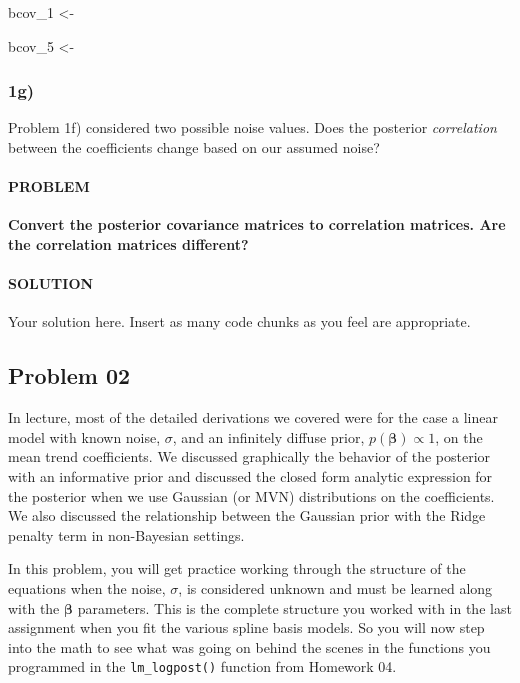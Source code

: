 \documentclass[
]{article}
\newenvironment{Shaded}{\begin{snugshade}}{\end{snugshade}}
\newcommand{\DecValTok}[1]{\textcolor[rgb]{0.00,0.00,0.81}{#1}}
\newcommand{\NormalTok}[1]{#1}
\newcommand{\StringTok}[1]{\textcolor[rgb]{0.31,0.60,0.02}{#1}}
\begin{document}
\begin{Shaded}
\begin{Highlighting}[]
\NormalTok{bcov_}\DecValTok{1}\NormalTok{ <-}\StringTok{ }

\NormalTok{bcov_}\DecValTok{5}\NormalTok{ <-}\StringTok{ }
\end{Highlighting}
\end{Shaded}

\hypertarget{g}{%
\subsubsection{1g)}\label{g}}

Problem 1f) considered two possible noise values. Does the posterior
\emph{correlation} between the coefficients change based on our assumed
noise?

\hypertarget{problem-6}{%
\paragraph{PROBLEM}\label{problem-6}}

\textbf{Convert the posterior covariance matrices to correlation
matrices. Are the correlation matrices different?}

\hypertarget{solution-6}{%
\paragraph{SOLUTION}\label{solution-6}}

Your solution here. Insert as many code chunks as you feel are
appropriate.

\hypertarget{problem-02}{%
\subsection{Problem 02}\label{problem-02}}

In lecture, most of the detailed derivations we covered were for the
case a linear model with known noise, \(\sigma\), and an infinitely
diffuse prior, \(p\left(\boldsymbol{\beta}\right) \propto 1\), on the
mean trend coefficients. We discussed graphically the behavior of the
posterior with an informative prior and discussed the closed form
analytic expression for the posterior when we use Gaussian (or MVN)
distributions on the coefficients. We also discussed the relationship
between the Gaussian prior with the Ridge penalty term in non-Bayesian
settings.

In this problem, you will get practice working through the structure of
the equations when the noise, \(\sigma\), is considered unknown and must
be learned along with the \(\boldsymbol{\beta}\) parameters. This is the
complete structure you worked with in the last assignment when you fit
the various spline basis models. So you will now step into the math to
see what was going on behind the scenes in the functions you programmed
in the \texttt{lm\_logpost()} function from Homework 04.
\end{document}

